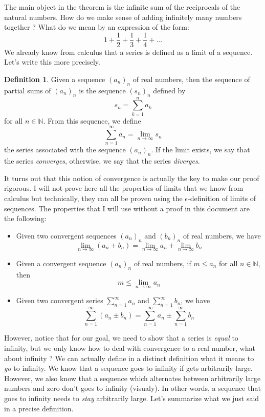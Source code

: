 \documentclass[10pt]{article}
\newcommand{\N}{\mathbb{N}}
\theoremstyle{definition}
\newtheorem*{definition}{Definition}
\begin{document}
The main object in the theorem is the infinite sum of the reciprocals of the natural numbers. How do we make sense of adding infinitely many numbers together ? What do we mean by an expression of the form:
$$1 + \frac{1}{2} + \frac{1}{3} + \frac{1}{4} + ...$$
We already know from calculus that a series is defined as a limit of a sequence. Let's write this more precisely.

\begin{definition}
    Given a sequence $(a_n)_n$ of real numbers, then the sequence of partial sums of $(a_n)_n$ is the sequence $(s_n)_n$ defined by
    $$s_n = \sum_{k=1}^{n}a_k$$
    for all $n \in \N$. From this sequence, we define
    $$\sum_{n=1}^{\infty}a_n = \lim_{n \rightarrow \infty}s_n$$
    the series associated with the sequence $(a_n)_n$. If the limit exists, we say that the series \textit{converges}, otherwise, we say that the series \textit{diverges}.\\
\end{definition}

It turns out that this notion of convergence is actually the key to make our proof rigorous. I will not prove here all the properties of limits that we know from calculus but technically, they can all be proven using the $\epsilon$-definition of limits of sequences. The properties that I will use without a proof in this document are the following: 

\begin{itemize}
    \item Given two convergent sequences $(a_n)_n$ and $(b_n)_n$ of real numbers, we have
    $$\lim_{n \rightarrow \infty}(a_n \pm b_n) = \lim_{n \rightarrow \infty}a_n \pm \lim_{n \rightarrow \infty}b_n$$
    \item Given a convergent sequence $(a_n)_n$ of real numbers, if $m \leq a_n$ for all $n \in \N$, then
    $$m \leq \lim_{n \rightarrow \infty}a_n$$
    \item Given two convergent series $\sum_{n=1}^{\infty}a_n$ and $\sum_{n=1}^{\infty}b_n$, we have
    $$\sum_{n=1}^{\infty}(a_n \pm b_n) = \sum_{n=1}^{\infty}a_n \pm \sum_{n=1}^{\infty}b_n$$
\end{itemize}

However, notice that for our goal, we need to show that a series is \textit{equal} to infinity, but we only know how to deal with convergence to a real number, what about infinity ? We can actually define in a distinct definition what it means to \textit{go} to infinity. We know that a sequence goes to infinity if gets arbitrarily large. However, we also know that a sequence which alternates between arbitrarily large numbers and zero don't goes to infinity (visualy). In other words, a sequence that goes to infinity needs to \textit{stay} arbitrarily large. Let's summarize what we just said in a precise definition.
\end{document}
